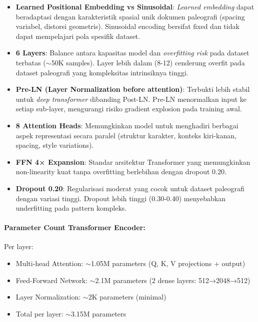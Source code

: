 \begin{itemize}[nosep]
    \item \textbf{Learned Positional Embedding vs Sinusoidal}: \textit{Learned embedding} dapat beradaptasi dengan karakteristik spasial unik dokumen paleografi (spacing variabel, distorsi geometris). Sinusoidal encoding bersifat fixed dan tidak dapat mempelajari pola spesifik dataset.
    
    \item \textbf{6 Layers}: Balance antara kapasitas model dan \textit{overfitting risk} pada dataset terbatas ($\sim$50K samples). Layer lebih dalam (8-12) cenderung overfit pada dataset paleografi yang kompleksitas intrinsiknya tinggi.
    
    \item \textbf{Pre-LN (Layer Normalization before attention)}: Terbukti lebih stabil untuk \textit{deep transformer} dibanding Post-LN. Pre-LN menormalkan input ke setiap sub-layer, mengurangi risiko gradient explosion pada training awal.
    
    \item \textbf{8 Attention Heads}: Memungkinkan model untuk menghadiri berbagai aspek representasi secara paralel (struktur karakter, konteks kiri-kanan, spacing, style variations).
    
    \item \textbf{FFN 4× Expansion}: Standar arsitektur Transformer yang memungkinkan non-linearity kuat tanpa overfitting berlebihan dengan dropout 0.20.
    
    \item \textbf{Dropout 0.20}: Regularisasi moderat yang cocok untuk dataset paleografi dengan variasi tinggi. Dropout lebih tinggi (0.30-0.40) menyebabkan underfitting pada pattern kompleks.
\end{itemize}

\paragraph{Parameter Count Transformer Encoder:}

Per layer:
\begin{itemize}[nosep]
    \item Multi-head Attention: $\sim$1.05M parameters (Q, K, V projections + output)
    \item Feed-Forward Network: $\sim$2.1M parameters (2 dense layers: 512→2048→512)
    \item Layer Normalization: $\sim$2K parameters (minimal)
    \item Total per layer: $\sim$3.15M parameters
\end{itemize}

